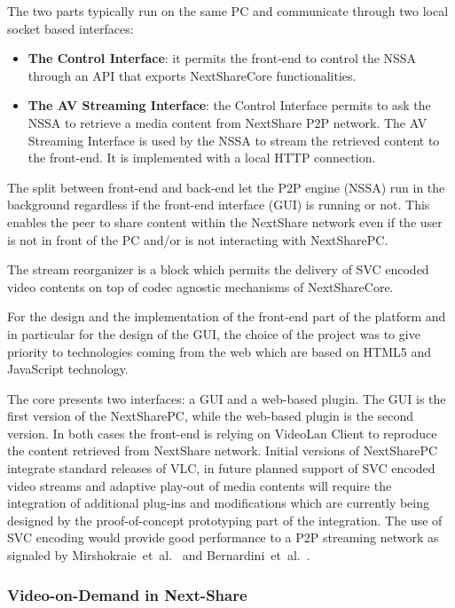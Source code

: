 The two parts typically run on the same PC and communicate through two local
socket based interfaces:
\begin{itemize}
  \item \textbf{The Control Interface}: it permits the front-end to control
  the NSSA through an API that exports NextShareCore functionalities.
  \item \textbf{The AV Streaming Interface}: the Control Interface permits to
  ask the NSSA to retrieve a media content from NextShare P2P network. The AV
  Streaming Interface is used by the NSSA to stream the retrieved content to
  the front-end. It is implemented with a local HTTP connection.
\end{itemize}

The split between front-end and back-end let the P2P engine (NSSA) run in the
background regardless if the front-end interface (GUI) is running or not. This
enables the peer to share content within the NextShare network even if the
user is not in front of the PC and/or is not interacting with NextSharePC.

The stream reorganizer is a block which permits the delivery of SVC encoded
video contents on top of codec agnostic mechanisms of NextShareCore.

For the design and the implementation of the front-end part of the platform
and in particular for the design of the GUI, the choice of the project was to
give priority to technologies coming from the web which are based on HTML5 and
JavaScript technology.

The core presents two interfaces: a GUI and a web-based plugin. The GUI is the
first version of the NextSharePC, while the web-based plugin is the second
version. In both cases the front-end is relying on VideoLan Client to
reproduce the content retrieved from NextShare network. Initial versions of
NextSharePC integrate standard releases of VLC, in future planned support of
SVC encoded video streams and adaptive play-out of media contents will require
the integration of additional plug-ins and modifications which are currently
being designed by the proof-of-concept prototyping part of the integration.
The use of SVC encoding would provide good performance to a P2P streaming
network as signaled by Mirshokraie~et~al.~\cite{p2p-streaming-svc} and
Bernardini~et~al.~\cite{p2p-streaming-net-coding}.

\subsubsection{Video-on-Demand in Next-Share}

